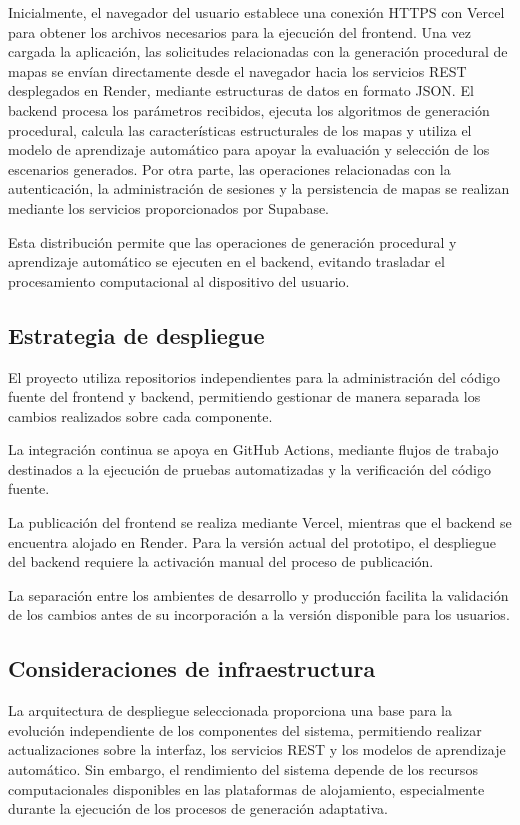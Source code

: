 Inicialmente, el navegador del usuario establece una conexión HTTPS con Vercel para obtener los archivos necesarios para la ejecución del frontend. Una vez cargada la aplicación, las solicitudes relacionadas con la generación procedural de mapas se envían directamente desde el navegador hacia los servicios REST desplegados en Render, mediante estructuras de datos en formato JSON. El backend procesa los parámetros recibidos, ejecuta los algoritmos de generación procedural, calcula las características estructurales de los mapas y utiliza el modelo de aprendizaje automático para apoyar la evaluación y selección de los escenarios generados. Por otra parte, las operaciones relacionadas con la autenticación, la administración de sesiones y la persistencia de mapas se realizan mediante los servicios proporcionados por Supabase.

Esta distribución permite que las operaciones de generación procedural y aprendizaje automático se ejecuten en el backend, evitando trasladar el procesamiento computacional al dispositivo del usuario.

\subsection{Estrategia de despliegue}

El proyecto utiliza repositorios independientes para la administración del código fuente del frontend y backend, permitiendo gestionar de
manera separada los cambios realizados sobre cada componente.

La integración continua se apoya en GitHub Actions, mediante flujos de trabajo destinados a la ejecución de pruebas automatizadas y
la verificación del código fuente.

La publicación del frontend se realiza mediante Vercel, mientras que el backend se encuentra alojado en Render. Para la versión actual del
prototipo, el despliegue del backend requiere la activación manual del proceso de publicación.

La separación entre los ambientes de desarrollo y producción facilita la validación de los cambios antes de su incorporación a la versión disponible para los usuarios.

\subsection{Consideraciones de infraestructura}

La arquitectura de despliegue seleccionada proporciona una base para la evolución independiente de los componentes del sistema, permitiendo realizar actualizaciones sobre la interfaz, los servicios REST y los modelos de aprendizaje automático. Sin embargo, el rendimiento del sistema depende de los recursos computacionales disponibles en las plataformas de alojamiento, especialmente durante la ejecución de los procesos de generación adaptativa.

